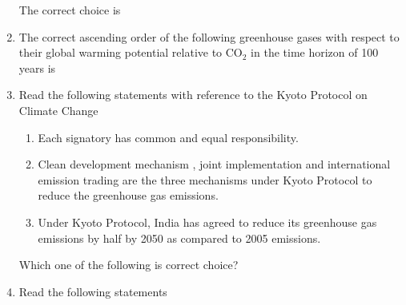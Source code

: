 \documentclass[journal,12pt,onecolumn]{IEEEtran}
\theoremstyle{remark}
\begin{document}
\begin{enumerate}
The correct choice is

\begin{enumerate}
\end{enumerate}
\hfill{}

\item The correct ascending order of the following greenhouse gases with respect to their global warming potential relative to CO$_2$ in the time horizon of 100 years is

\begin{enumerate}
\end{enumerate}
\hfill{}

\newpage

\item Read the following statements with reference to the Kyoto Protocol on Climate Change

\begin{enumerate}[label=\roman*.]
\item Each signatory  has common and equal responsibility.
\item Clean development mechanism , joint implementation  and international emission trading are the three mechanisms under Kyoto Protocol to reduce the greenhouse gas emissions.
\item Under Kyoto Protocol, India has agreed to reduce its greenhouse gas emissions by half by 2050 as compared to 2005 emissions.
\end{enumerate}

Which one of the following is correct choice?

\begin{enumerate}
\end{enumerate}
\hfill{}
\item Read the following statements


\end{enumerate}
\end{document}
